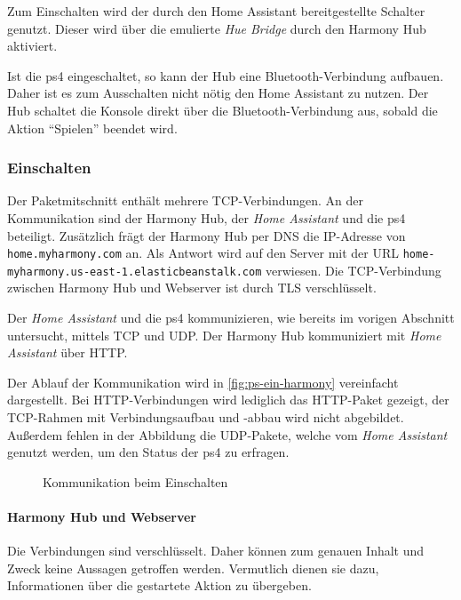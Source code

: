 Zum Einschalten wird der durch den Home Assistant bereitgestellte Schalter genutzt.
Dieser wird über die emulierte \textit{Hue Bridge} durch den Harmony Hub aktiviert.

Ist die \ac{ps4} eingeschaltet, so kann der Hub eine Bluetooth-Verbindung aufbauen.
Daher ist es zum Ausschalten nicht nötig den Home Assistant zu nutzen.
Der Hub schaltet die Konsole direkt über die Bluetooth-Verbindung aus,
sobald die Aktion \enquote{Spielen} beendet wird.

\subsubsection{Einschalten}
Der Paketmitschnitt enthält mehrere TCP-Verbindungen.
An der Kommunikation sind der Harmony Hub, der \textit{Home Assistant} und die \ac{ps4} beteiligt.
Zusätzlich frägt der Harmony Hub per DNS die IP-Adresse von \nolinkurl{home.myharmony.com} an.
Als Antwort wird auf den Server mit der URL \nolinkurl{home-myharmony.us-east-1.elasticbeanstalk.com} verwiesen.
Die TCP-Verbindung zwischen Harmony Hub und Webserver ist durch TLS verschlüsselt.

Der \textit{Home Assistant} und die \ac{ps4} kommunizieren, wie bereits im vorigen Abschnitt untersucht, mittels TCP und UDP.
Der Harmony Hub kommuniziert mit \textit{Home Assistant} über HTTP.

Der Ablauf der Kommunikation wird in \autoref{fig:ps-ein-harmony} vereinfacht dargestellt.
Bei HTTP-Verbindungen wird lediglich das HTTP-Paket gezeigt,
der TCP-Rahmen mit Verbindungsaufbau und -abbau wird nicht abgebildet.
Außerdem fehlen in der Abbildung die UDP-Pakete,
welche vom \textit{Home Assistant} genutzt werden,
um den Status der \ac{ps4} zu erfragen.

\begin{figure}
    \centering
    \resizebox{\textwidth}{!}{
        
    }
    \caption{Kommunikation beim Einschalten}
    \label{fig:ps-ein-harmony}
\end{figure}

\newpage



\paragraph{Harmony Hub und Webserver}
Die Verbindungen sind verschlüsselt.
Daher können zum genauen Inhalt und Zweck keine Aussagen getroffen werden.
Vermutlich dienen sie dazu, Informationen über die gestartete Aktion zu übergeben.

